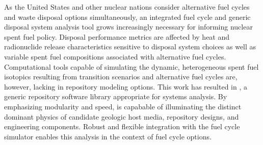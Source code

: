 As the United States and other nuclear nations consider alternative fuel cycles 
and waste disposal options simultaneously, an integrated fuel cycle and generic disposal system 
analysis tool grows increasingly necessary for informing nuclear spent 
fuel policy. Disposal performance metrics are affected by heat and radionuclide release 
characteristics sensitive to disposal system choices as well as variable spent 
fuel compositions associated  with alternative fuel cycles.  Computational 
tools capable of simulating the dynamic, heterogeneous spent fuel isotopics 
resulting from transition scenarios and alternative fuel cycles are, however, 
lacking in repository modeling  options.  This work has resulted in \Cyder, a 
generic repository software library appropriate for systems analysis.  By emphasizing 
modularity and speed, \Cyder is capabable of illuminating the distinct dominant 
physics of candidate geologic host media, repository designs, and engineering components. 
Robust and flexible integration with the \Cyclus fuel cycle simulator
enables this analysis in the context of fuel cycle options.  

\glsresetall
